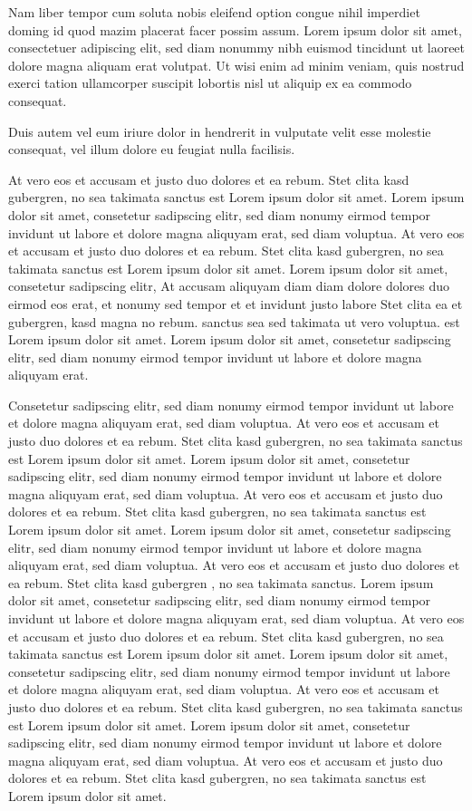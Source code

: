 \documentclass{article}
\begin{document}
Nam liber tempor cum soluta nobis eleifend option congue nihil imperdiet doming id quod mazim placerat facer possim
assum. Lorem ipsum dolor sit amet, consectetuer adipiscing elit, sed diam nonummy nibh euismod tincidunt ut laoreet
dolore magna aliquam erat volutpat. Ut wisi enim ad minim veniam, quis nostrud exerci tation ullamcorper suscipit
lobortis nisl ut aliquip ex ea commodo consequat.

Duis autem vel eum iriure dolor in hendrerit in vulputate velit esse molestie consequat, vel illum dolore eu feugiat
nulla facilisis.

At vero eos et accusam et justo duo dolores et ea rebum. Stet clita kasd gubergren, no sea takimata sanctus est Lorem
ipsum dolor sit amet. Lorem ipsum dolor sit amet, consetetur sadipscing elitr, sed diam nonumy eirmod tempor invidunt
ut labore et dolore magna aliquyam erat, sed diam voluptua. At vero eos et accusam et justo duo dolores et ea rebum.
Stet clita kasd gubergren, no sea takimata sanctus est Lorem ipsum dolor sit amet. Lorem ipsum dolor sit amet,
consetetur sadipscing elitr, At accusam aliquyam diam diam dolore dolores duo eirmod eos erat, et nonumy sed tempor
et et invidunt justo labore Stet clita ea et gubergren, kasd magna no rebum. sanctus sea sed takimata ut vero
voluptua. est Lorem ipsum dolor sit amet. Lorem ipsum dolor sit amet, consetetur sadipscing elitr, sed diam nonumy
eirmod tempor invidunt ut labore et dolore magna aliquyam erat.

Consetetur sadipscing elitr, sed diam nonumy eirmod tempor invidunt ut labore et dolore magna aliquyam erat, sed diam
voluptua. At vero eos et accusam et justo duo dolores et ea rebum. Stet clita kasd gubergren, no sea takimata sanctus
est Lorem ipsum dolor sit amet. Lorem ipsum dolor sit amet, consetetur sadipscing elitr, sed diam nonumy eirmod
tempor invidunt ut labore et dolore magna aliquyam erat, sed diam voluptua. At vero eos et accusam et justo duo
dolores et ea rebum. Stet clita kasd gubergren, no sea takimata sanctus est Lorem ipsum dolor sit amet. Lorem ipsum
dolor sit amet, consetetur sadipscing elitr, sed diam nonumy eirmod tempor invidunt ut labore et dolore magna
aliquyam erat, sed diam voluptua. At vero eos et accusam et justo duo dolores et ea rebum. Stet clita kasd gubergren
, no sea takimata sanctus. Lorem ipsum dolor sit amet, consetetur sadipscing elitr, sed diam nonumy eirmod tempor
invidunt ut labore et dolore magna aliquyam erat, sed diam voluptua. At vero eos et accusam et justo duo dolores et
ea rebum. Stet clita kasd gubergren, no sea takimata sanctus est Lorem ipsum dolor sit amet. Lorem ipsum dolor sit
amet, consetetur sadipscing elitr, sed diam nonumy eirmod tempor invidunt ut labore et dolore magna aliquyam erat,
sed diam voluptua. At vero eos et accusam et justo duo dolores et ea rebum. Stet clita kasd gubergren, no sea
takimata sanctus est Lorem ipsum dolor sit amet. Lorem ipsum dolor sit amet, consetetur sadipscing elitr, sed diam
nonumy eirmod tempor invidunt ut labore et dolore magna aliquyam erat, sed diam voluptua. At vero eos et accusam et
justo duo dolores et ea rebum. Stet clita kasd gubergren, no sea takimata sanctus est Lorem ipsum dolor sit amet.
\end{document}
